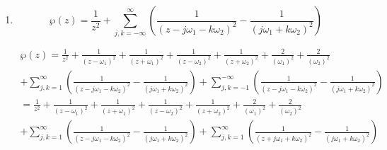 \documentclass[a4paper]{article}
\begin{document}
\begin{enumerate}
\begin{enumerate}
		\item
		\[	\wp(z)=\frac{1}{z^2}+\sum_{j,k=-\infty}^\infty \left(\frac{1}{(z-j
			\omega_1-k \omega_2)^2}-\frac{1}{(j \omega_1+k \omega_2)^2}\right)\]
		                         	\begin{center}             
		                         		\begin{gather*}
	\wp(z)	=\frac{1}{z^2}+ \frac{1}{(z- \omega_1)^2}+ \frac{1}{(z+ \omega_1)^2}+ \frac{1}{(z- \omega_2)^2}+ \frac{1}{(z+ \omega_2)^2}+ \frac{2}{( \omega_1)^2} + \frac{2}{(\omega_2)^2}
	 \\ +\sum_{j,k=1}^\infty \left(\frac{1}{(z-j
				\omega_1-k \omega_2)^2}-\frac{1}{(j \omega_1+k \omega_2)^2}\right)		+ \sum_{j,k=-1}^{-\infty} \left(\frac{1}{(z-j
		\omega_1-k \omega_2)^2}-\frac{1}{(j \omega_1+k \omega_2)^2}\right)		
		\\		=\frac{1}{z^2}+ \frac{1}{(z- \omega_1)^2}+ \frac{1}{(z+ \omega_1)^2}+ \frac{1}{(z- \omega_2)^2}+ \frac{1}{(z+ \omega_2)^2}+ \frac{2}{( \omega_1)^2} + \frac{2}{(\omega_2)^2}
		\\+\sum_{j,k=1}^\infty \left(\frac{1}{(z-j
			\omega_1-k \omega_2)^2}-\frac{1}{(j \omega_1+k \omega_2)^2}\right)		+ \sum_{j,k=1}^{\infty} \left(\frac{1}{(z+j
			\omega_1+k \omega_2)^2}-\frac{1}{(j \omega_1+k \omega_2)^2}\right)								\end{gather*} 
		\end{center}
			

\end{enumerate}
\end{enumerate}
\end{document}
